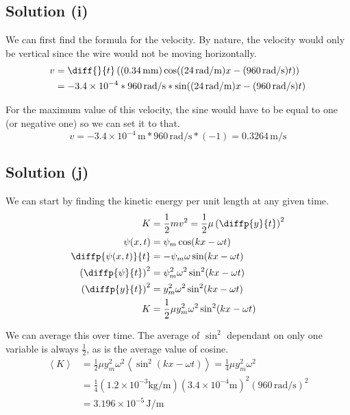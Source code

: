 \documentclass[12pt]{article}
\newcommand{\E}[1]{\times 10^{#1}}
\begin{document}
        \subsection{Solution (i)}
            We can first find the formula for the velocity.
            By nature, the velocity would only be vertical since the wire would not be moving horizontally.
            \begin{align}
                v   &=  \diff{}{t}\left( (0.34\,\unit{\milli\meter}) \cos((24\,\unit{\radian/\meter})x - (960\,\unit{\radian/\second})t) \right)\\
                    &=  - 3.4\E{-4} * 960\,\unit{\radian/\second} * \sin((24\,\unit{\radian/\meter})x - (960\,\unit{\radian/\second})t)
            \end{align}

            For the maximum value of this velocity, the sine would have to be equal to one (or negative one) so we can set it to that.
            \begin{equation}
                v   =   -3.4\E{-4}\,\unit{\meter} * 960\,\unit{\radian/\second} * (-1)
                    =   \boxed{0.3264\,\unit{\meter/\second}}
            \end{equation}

        \subsection{Solution (j)}
            We can start by finding the kinetic energy per unit length at any given time.
            \begin{align}
                K   &=  \frac{1}{2}mv^2
                    =   \frac{1}{2}\mu\left( \diffp{y}{t} \right)^2\\
                \psi (x,t)  &=  \psi_m \cos(k x - \omega t)\\
                \diffp{\psi (x,t)}{t}   &=  -\psi_m \omega \sin(k x - \omega t)\\
                \left( \diffp{\psi}{t} \right)^2    &=  \psi_m^2 \omega^2 \sin^2(k x - \omega t)\\
                \left( \diffp{y}{t} \right)^2    &=  y_m^2 \omega^2 \sin^2(k x - \omega t)\\
                K   &=  \frac{1}{2}\mu y_m^2 \omega^2 \sin^2(k x - \omega t)
            \end{align}

            We can average this over time. The average of $\sin^2$ dependant on only one variable is always $\frac{1}{2}$, as is the average value of cosine. 
            \begin{align}
                \left\langle K \right\rangle    &=  \frac{1}{2}\mu y_m^2 \omega^2 \left\langle \sin^2(k x - \omega t) \right\rangle
                    =   \frac{1}{4} \mu y_m^2 \omega^2\\
                    &=  \frac{1}{4} (1.2\E{-3}\unit{\kilo\gram/\meter}) \left( 3.4\E{-4}\unit{\meter} \right)^2 (960\,\unit{\radian/\second})^2\\
                    &=  \boxed{3.196\E{-5}\,\unit{\joule/\meter}}
            \end{align}
\end{document}
